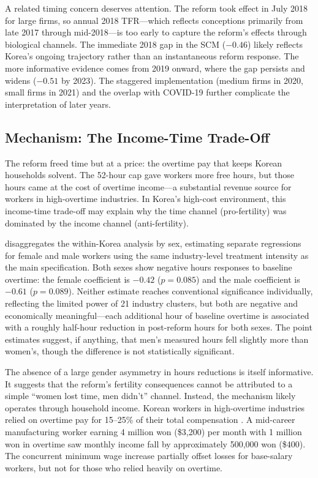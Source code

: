 \documentclass[12pt]{article}
\begin{document}
A related timing concern deserves attention. The reform took effect in July 2018 for large firms, so annual 2018 TFR---which reflects conceptions primarily from late 2017 through mid-2018---is too early to capture the reform's effects through biological channels. The immediate 2018 gap in the SCM ($-0.46$) likely reflects Korea's ongoing trajectory rather than an instantaneous reform response. The more informative evidence comes from 2019 onward, where the gap persists and widens ($-0.51$ by 2023). The staggered implementation (medium firms in 2020, small firms in 2021) and the overlap with COVID-19 further complicate the interpretation of later years.

\subsection{Mechanism: The Income-Time Trade-Off}

The reform freed time but at a price: the overtime pay that keeps Korean households solvent. The 52-hour cap gave workers more free hours, but those hours came at the cost of overtime income---a substantial revenue source for workers in high-overtime industries. In Korea's high-cost environment, this income-time trade-off may explain why the time channel (pro-fertility) was dominated by the income channel (anti-fertility).

 disaggregates the within-Korea analysis by sex, estimating separate regressions for female and male workers using the same industry-level treatment intensity as the main specification. Both sexes show negative hours responses to baseline overtime: the female coefficient is $-0.42$ ($p = 0.085$) and the male coefficient is $-0.61$ ($p = 0.089$). Neither estimate reaches conventional significance individually, reflecting the limited power of 21 industry clusters, but both are negative and economically meaningful---each additional hour of baseline overtime is associated with a roughly half-hour reduction in post-reform hours for both sexes. The point estimates suggest, if anything, that men's measured hours fell slightly more than women's, though the difference is not statistically significant.

The absence of a large gender asymmetry in hours reductions is itself informative. It suggests that the reform's fertility consequences cannot be attributed to a simple ``women lost time, men didn't'' channel. Instead, the mechanism likely operates through household income. Korean workers in high-overtime industries relied on overtime pay for 15--25\% of their total compensation \citep{kli2020workhours}. A mid-career manufacturing worker earning 4 million won (\$3,200) per month with 1 million won in overtime saw monthly income fall by approximately 500,000 won (\$400). The concurrent minimum wage increase partially offset losses for base-salary workers, but not for those who relied heavily on overtime.
\end{document}
